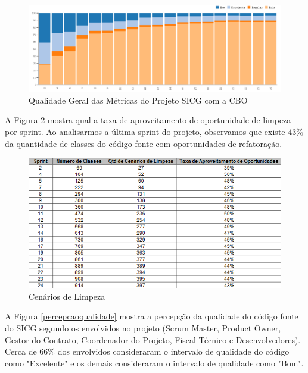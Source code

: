 \begin{figure}[H]
		\centering
			\includegraphics[scale=0.5]{figuras/todasmetricasComCOB.png}
		\caption{Qualidade Geral das Métricas do Projeto SICG com a CBO}
		\label{qualidadesprint2}
\end{figure}

A Figura \ref{cenarios} mostra qual a taxa de aproveitamento de oportunidade de limpeza por sprint. Ao analisarmos a última sprint do projeto, observamos que existe 43\%  da quantidade de classes do código fonte com oportunidades de refatoração. 

\begin{figure}[H]
		\centering
			\includegraphics[scale=1.0]{figuras/cenarios.png}
		\caption{Cenários de Limpeza}
		\label{cenarios}
\end{figure}

A Figura \ref{percepcaoqualidade} mostra a percepção da qualidade do código fonte do SICG segundo os envolvidos no projeto (Scrum Master, Product Owner, Gestor do Contrato, Coordenador do Projeto, Fiscal Técnico e Desenvolvedores). Cerca de 66\% dos envolvidos consideraram  o intervalo de qualidade do código como "Excelente" e os demais consideraram
o intervalo de qualidade como "Bom".

